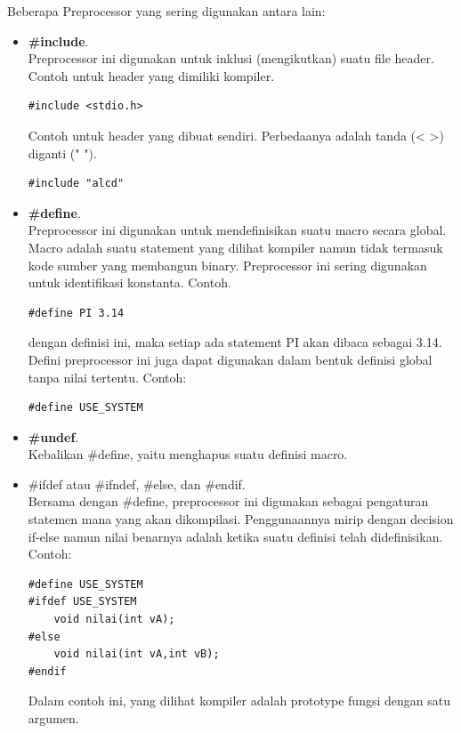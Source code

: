 \documentclass[12pt,]{article}
\begin{document}
	Beberapa Preprocessor yang sering digunakan antara lain:
	\begin{itemize}
		\item \textbf{\#include}. \\
		Preprocessor ini digunakan untuk inklusi (mengikutkan) suatu file header.
		Contoh untuk header yang dimiliki kompiler.
		\begin{verbatim}
#include <stdio.h>
		\end{verbatim}

		Contoh untuk header yang dibuat sendiri.
		Perbedaanya adalah tanda (< >) diganti (" ").
		\begin{verbatim}
#include "alcd"
		\end{verbatim}

		\item \textbf{\#define}. \\
		Preprocessor ini digunakan untuk mendefinisikan suatu macro secara global.
		Macro adalah suatu statement yang dilihat kompiler namun tidak termasuk kode sumber yang membangun binary.
		Preprocessor ini sering digunakan untuk identifikasi konstanta.
		Contoh.
		\begin{verbatim}
#define PI 3.14
		\end{verbatim}
		dengan definisi ini, maka setiap ada statement PI akan dibaca sebagai 3.14.
		Defini preprocessor ini juga dapat digunakan dalam bentuk definisi global tanpa nilai tertentu.
		Contoh:
		\begin{verbatim}
#define USE_SYSTEM
		\end{verbatim}

		\item \textbf{\#undef}. \\
		Kebalikan \#define, yaitu menghapus suatu definisi macro.

		\item \#ifdef atau \#ifndef, \#else, dan \#endif. \\
		Bersama dengan \#define, preprocessor ini digunakan sebagai pengaturan statemen mana yang akan dikompilasi.
		Penggunaannya mirip dengan decision if-else namun nilai benarnya adalah ketika suatu definisi telah didefinisikan.
		Contoh:
		\begin{verbatim}
#define USE_SYSTEM
#ifdef USE_SYSTEM
	void nilai(int vA);
#else
	void nilai(int vA,int vB);
#endif
		\end{verbatim}
		Dalam contoh ini, yang dilihat kompiler adalah prototype fungsi dengan satu argumen.


\end{itemize}
\end{document}
